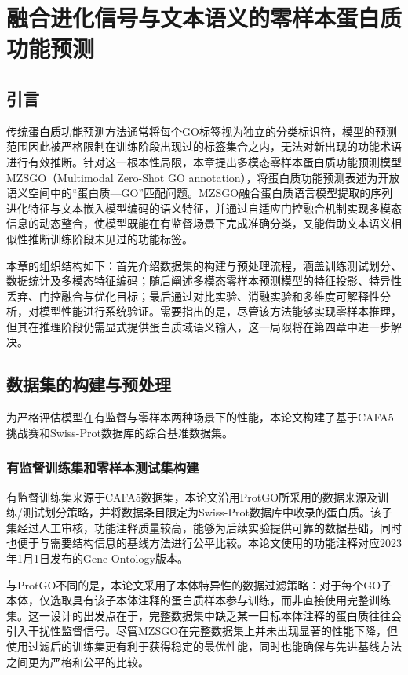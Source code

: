 
\chapter{融合进化信号与文本语义的零样本蛋白质功能预测}

\section{引言}

传统蛋白质功能预测方法通常将每个GO标签视为独立的分类标识符，模型的预测范围因此被严格限制在训练阶段出现过的标签集合之内，无法对新出现的功能术语进行有效推断。针对这一根本性局限，本章提出多模态零样本蛋白质功能预测模型MZSGO（Multimodal Zero-Shot GO annotation），将蛋白质功能预测表述为开放语义空间中的“蛋白质—GO”匹配问题。MZSGO融合蛋白质语言模型提取的序列进化特征与文本嵌入模型编码的语义特征，并通过自适应门控融合机制实现多模态信息的动态整合，使模型既能在有监督场景下完成准确分类，又能借助文本语义相似性推断训练阶段未见过的功能标签。

本章的组织结构如下：首先介绍数据集的构建与预处理流程，涵盖训练测试划分、数据统计及多模态特征编码；随后阐述多模态零样本预测模型的特征投影、特异性丢弃、门控融合与优化目标；最后通过对比实验、消融实验和多维度可解释性分析，对模型性能进行系统验证。需要指出的是，尽管该方法能够实现零样本推理，但其在推理阶段仍需显式提供蛋白质域语义输入，这一局限将在第四章中进一步解决。

\section{数据集的构建与预处理}\label{sec:mzsgo_datasets}

为严格评估模型在有监督与零样本两种场景下的性能，本论文构建了基于CAFA5挑战赛和Swiss-Prot数据库\cite{boutet2007uniprotkb}的综合基准数据集。

\subsection{有监督训练集和零样本测试集构建}

有监督训练集来源于CAFA5数据集，本论文沿用ProtGO\cite{wang2025protgo}所采用的数据来源及训练/测试划分策略，并将数据条目限定为Swiss-Prot数据库中收录的蛋白质。该子集经过人工审核，功能注释质量较高，能够为后续实验提供可靠的数据基础，同时也便于与需要结构信息的基线方法进行公平比较。本论文使用的功能注释对应2023年1月1日发布的Gene Ontology版本。

与ProtGO不同的是，本论文采用了本体特异性的数据过滤策略：对于每个GO子本体，仅选取具有该子本体注释的蛋白质样本参与训练，而非直接使用完整训练集。这一设计的出发点在于，完整数据集中缺乏某一目标本体注释的蛋白质往往会引入干扰性监督信号。尽管MZSGO在完整数据集上并未出现显著的性能下降，但使用过滤后的训练集更有利于获得稳定的最优性能，同时也能确保与先进基线方法之间更为严格和公平的比较。

